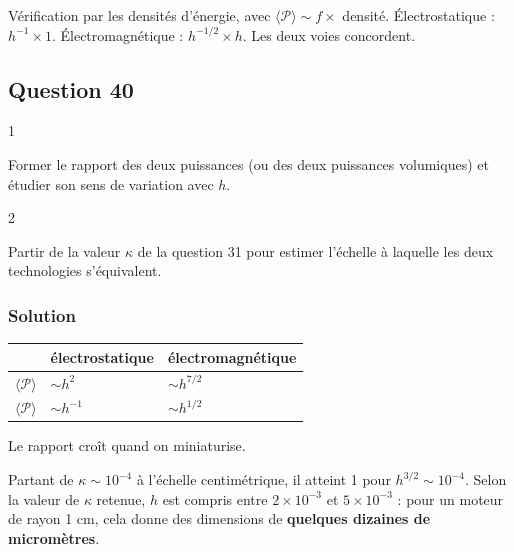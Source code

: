 \documentclass[11pt,a4paper]{article}
\newcommand{\equationajustee}[1]{%
  \sbox{\boiteequation}{$\displaystyle #1$}%
  \ifdim\wd\boiteequation>\linewidth
    \[\resizebox{\linewidth}{!}{\usebox{\boiteequation}}\]%
  \else
    \[#1\]%
  \fi}
\begin{document}
\begin{methode}

Vérification par les densités d'énergie, avec \(\langle\mathscr P\rangle\sim f\times\) densité. Électrostatique : \(h^{-1}\times1\). Électromagnétique : \(h^{-1/2}\times h\). Les deux voies concordent.

\end{methode}

\hypertarget{question-40}{%
\subsection{Question 40}\label{question-40}}

\begin{indication}{1}

Former le rapport des deux puissances (ou des deux puissances volumiques) et étudier son sens de variation avec \(h\).

\end{indication}

\begin{indication}{2}

Partir de la valeur \(\kappa\) de la question 31 pour estimer l'échelle à laquelle les deux technologies s'équivalent.

\end{indication}

\hypertarget{solution-39}{%
\subsubsection{Solution}\label{solution-39}}

\begin{longtable}[]{@{}lll@{}}
\toprule\noalign{}
& électrostatique & électromagnétique \\
\midrule\noalign{}
\endhead
\bottomrule\noalign{}
\endlastfoot
\(\langle\mathcal P\rangle\) & \(\sim h^2\) & \(\sim h^{7/2}\) \\
\(\langle\mathscr P\rangle\) & \(\sim h^{-1}\) & \(\sim h^{1/2}\) \\
\end{longtable}

\equationajustee{\boxed{\frac{\langle\mathcal P_{\text{m,el}}\rangle}{\langle\mathcal P_{\text{m,ma}}\rangle}\sim h^{-3/2}}}
Le rapport croît quand on miniaturise.

Partant de \(\kappa\sim10^{-4}\) à l'échelle centimétrique, il atteint 1 pour \(h^{3/2}\sim10^{-4}\). Selon la valeur de \(\kappa\) retenue, \(h\) est compris entre \(2\times10^{-3}\) et \(5\times10^{-3}\) : pour un moteur de rayon 1 cm, cela donne des dimensions de \textbf{quelques dizaines de micromètres}.
\end{document}
